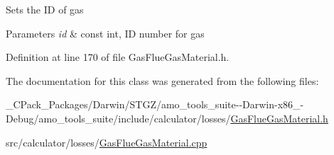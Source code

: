 Sets the ID of gas 
\begin{DoxyParams}{Parameters}
{\em id} & const int, ID number for gas \\
\hline
\end{DoxyParams}


Definition at line 170 of file Gas\+Flue\+Gas\+Material.\+h.



The documentation for this class was generated from the following files\+:\begin{DoxyCompactItemize}
\item 
\+\_\+\+C\+Pack\+\_\+\+Packages/\+Darwin/\+S\+T\+G\+Z/amo\+\_\+tools\+\_\+suite-\/-\/\+Darwin-\/x86\+\_-\/\+Debug/amo\+\_\+tools\+\_\+suite/include/calculator/losses/\hyperlink{___c_pack___packages_2_darwin_2_s_t_g_z_2amo__tools__suite--_darwin-x86__64-_debug_2amo__tools__4660f703408c33ec3ee2abb47d5010e4}{Gas\+Flue\+Gas\+Material.\+h}\item 
src/calculator/losses/\hyperlink{_gas_flue_gas_material_8cpp}{Gas\+Flue\+Gas\+Material.\+cpp}\end{DoxyCompactItemize}
